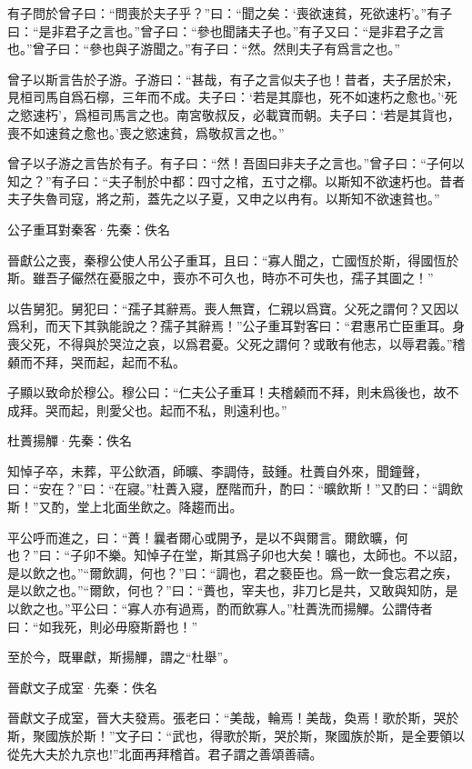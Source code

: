 \documentclass[12pt,a4paper]{ctexbook}
\begin{document}
有子問於曾子曰：“問喪於夫子乎？”曰：“聞之矣：‘喪欲速貧，死欲速朽’。”有子曰：“是非君子之言也。”曾子曰：“參也聞諸夫子也。”有子又曰：“是非君子之言也。”曾子曰：“參也與子游聞之。”有子曰：“然。然則夫子有爲言之也。”\par
曾子以斯言告於子游。子游曰：“甚哉，有子之言似夫子也！昔者，夫子居於宋，見桓司馬自爲石槨，三年而不成。夫子曰：‘若是其靡也，死不如速朽之愈也。’‘死之慾速朽’，爲桓司馬言之也。南宮敬叔反，必載寶而朝。夫子曰：‘若是其貨也，喪不如速貧之愈也。’喪之慾速貧，爲敬叔言之也。”\par
曾子以子游之言告於有子。有子曰：“然！吾固曰非夫子之言也。”曾子曰：“子何以知之？”有子曰：“夫子制於中都：四寸之棺，五寸之槨。以斯知不欲速朽也。昔者夫子失魯司寇，將之荊，蓋先之以子夏，又申之以冉有。以斯知不欲速貧也。”\par
公子重耳對秦客·先秦：佚名 \par
晉獻公之喪，秦穆公使人吊公子重耳，且曰：“寡人聞之，亡國恆於斯，得國恆於斯。雖吾子儼然在憂服之中，喪亦不可久也，時亦不可失也，孺子其圖之！”\par
以告舅犯。舅犯曰：“孺子其辭焉。喪人無寶，仁親以爲寶。父死之謂何？又因以爲利，而天下其孰能說之？孺子其辭焉！”公子重耳對客曰：“君惠吊亡臣重耳。身喪父死，不得與於哭泣之哀，以爲君憂。父死之謂何？或敢有他志，以辱君義。”稽顙而不拜，哭而起，起而不私。\par
子顯以致命於穆公。穆公曰：“仁夫公子重耳！夫稽顙而不拜，則未爲後也，故不成拜。哭而起，則愛父也。起而不私，則遠利也。”\par
杜蕢揚觶·先秦：佚名 \par
知悼子卒，未葬，平公飲酒，師曠、李調侍，鼓鍾。杜蕢自外來，聞鐘聲，曰：“安在？”曰：“在寢。”杜蕢入寢，歷階而升，酌曰：“曠飲斯！”又酌曰：“調飲斯！”又酌，堂上北面坐飲之。降趨而出。\par
平公呼而進之，曰：“蕢！曩者爾心或開予，是以不與爾言。爾飲曠，何也？”曰：“子卯不樂。知悼子在堂，斯其爲子卯也大矣！曠也，太師也。不以詔，是以飲之也。”“爾飲調，何也？”曰：“調也，君之褻臣也。爲一飲一食忘君之疾，是以飲之也。”“爾飲，何也？”曰：“蕢也，宰夫也，非刀匕是共，又敢與知防，是以飲之也。”平公曰：“寡人亦有過焉，酌而飲寡人。”杜蕢洗而揚觶。公謂侍者曰：“如我死，則必毋廢斯爵也！”\par
至於今，既畢獻，斯揚觶，謂之“杜舉”。\par
晉獻文子成室·先秦：佚名 \par
晉獻文子成室，晉大夫發焉。張老曰：“美哉，輪焉！美哉，奐焉！歌於斯，哭於斯，聚國族於斯！”文子曰：“武也，得歌於斯，哭於斯，聚國族於斯，是全要領以從先大夫於九京也!”北面再拜稽首。君子謂之善頌善禱。\par
\end{document}
